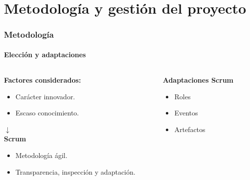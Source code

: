 \documentclass{beamer}
\begin{document}
\begin{frame}
\begin{columns}[T]
{\begin{column}{0.6\textwidth}
		\end{column}}
	\end{columns}
\end{frame}


\section{Metodología y gestión del proyecto}
 \begin{frame}
 	
 	\frametitle{Metodología}
 	\framesubtitle{Elección y adaptaciones}

 		\begin{columns}[T]
 		\hspace{-3cm}

 		\begin{column}{0.8\textwidth}
 			\begin{description}[labelwidth=0.01mm]
				\item \textbf{Factores considerados:}
			 	\begin{itemize}
				\item Carácter innovador.
				\item Escaso conocimiento.
			 	\end{itemize}
			 	\pause
 				\hspace{3cm}$\downarrow$ \\
		 		\textbf{Scrum}
	 	 		\begin{itemize}
			 	 	\item Metodología ágil.
			 		\item Transparencia, inspección y adaptación.
		 		\end{itemize}
			\end{description}
		 \end{column}
	 	\pause
	 	\hspace{-3.5cm}
		 \begin{column}{0.8\textwidth}
		 	\begin{description}[labelwidth=0.01mm]
		 		\item \textbf{Adaptaciones Scrum} 			 	\pause
		 		\begin{itemize}
		 			\item Roles
		 			\item Eventos
		 			\item Artefactos

\end{itemize}
\end{description}
\end{column}
\end{columns}
\end{frame}
\end{document}
